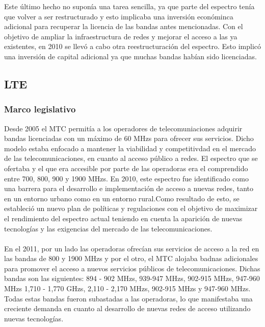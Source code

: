Este último hecho no suponía una tarea sencilla, ya que parte del espectro tenía que volver a ser restructurado y esto implicaba una inversión económinca adicional para recuperar la licencia de las bandas antes mencionadas. Con el objetivo de ampliar la infraestructura de redes y mejorar el acceso a las ya existentes, en 2010 se llevó a cabo otra reestructuración del espectro. Esto implicó una inversión de capital adicional ya que muchas bandas habían sido licenciadas.

		
\subsection{LTE}

\subsubsection{Marco legislativo}
Desde 2005 el MTC permitía a los operadores de telecomuniaciones adquirir bandas licenciadas con un máximo de 60 MHzs para ofrecer sus servicios. Dicho modelo estaba enfocado a mantener la viabilidad y competitivdad en el mercado de las telecomunicaciones, en cuanto al acceso público a redes. El espectro que se ofertaba y el que era accesible por parte de las operadoras era el comprendido entre 700, 800, 900 y 1900 MHzs. En 2010, este espectro fue identificado como una barrera para el desarrollo e implementación de acceso a nuevas redes, tanto en un entorno urbano como en un entorno rural.Como resultado de esto, se estableció un nuevo plan de políticas y regulaciones con el objetivo de maximizar el rendimiento del espectro actual teniendo en cuenta la aparición de nuevas tecnologías y las exigencias del mercado de las telecomunicaciones.\\\\

En el 2011,  por un lado las operadoras ofrecían sus servicios de acceso a la red en las bandas de 800 y 1900 MHzs y por el otro, el MTC alojaba badnas adicionales para promover el acceso a nuevos servicios públicos de telecomunicaciones. Dichas bandas son las siguientes: 894 - 902 MHzs, 939-947 MHzs, 902-915 MHzs, 947-960 MHzs 1,710 - 1,770 GHzs, 2,110 - 2,170 MHzs, 902-915 MHzs y 947-960 MHzs. Todas estas bandas fueron subastadas a las operadoras, lo que manifestaba una creciente demanda en cuanto al desarrollo de nuevas redes de acceso utilizando nuevas tecnologías.\\\\

